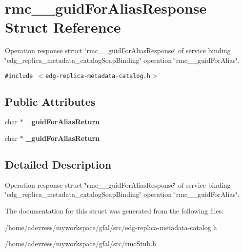 \section{rmc\_\-\_\-guid\-For\-Alias\-Response Struct Reference}
\label{structrmc____guidForAliasResponse}
Operation response struct \char`\"{}rmc\_\-\_\-guid\-For\-Alias\-Response\char`\"{} of service binding \char`\"{}edg\_\-replica\_\-metadata\_\-catalog\-Soap\-Binding\char`\"{} operation \char`\"{}rmc\_\-\_\-guid\-For\-Alias\char`\"{}.  


{\tt \#include $<$edg-replica-metadata-catalog.h$>$}

\subsection*{Public Attributes}
\begin{CompactItemize}
\item 
char $\ast$ \textbf{\_\-guid\-For\-Alias\-Return}\label{structrmc____guidForAliasResponse_7430bdbfddb260640c142a3fba2a2dbe}

\item 
char $\ast$ \textbf{\_\-guid\-For\-Alias\-Return}\label{structrmc____guidForAliasResponse_7430bdbfddb260640c142a3fba2a2dbe}

\end{CompactItemize}


\subsection{Detailed Description}
Operation response struct \char`\"{}rmc\_\-\_\-guid\-For\-Alias\-Response\char`\"{} of service binding \char`\"{}edg\_\-replica\_\-metadata\_\-catalog\-Soap\-Binding\char`\"{} operation \char`\"{}rmc\_\-\_\-guid\-For\-Alias\char`\"{}. 



The documentation for this struct was generated from the following files:\begin{CompactItemize}
\item 
/home/adevress/myworkspace/gfal/src/edg-replica-metadata-catalog.h\item 
/home/adevress/myworkspace/gfal/src/rmc\-Stub.h\end{CompactItemize}
